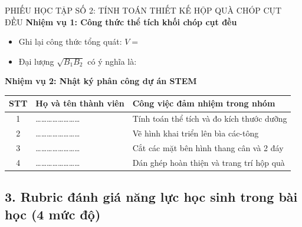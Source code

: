 \documentclass[12pt, a4paper]{article}
\begin{document}
\begin{itemize}[leftmargin=1.2cm]
\begin{pedabox}{PHIẾU HỌC TẬP SỐ 2: TÍNH TOÁN THIẾT KẾ HỘP QUÀ CHÓP CỤT ĐỀU}
    \textbf{Nhiệm vụ 1: Công thức thể tích khối chóp cụt đều}
    \begin{itemize}[leftmargin=0.6cm]
        \item Ghi lại công thức tổng quát: $V = $ \dotfill
        \item Đại lượng $\sqrt{B_1 B_2}$ có ý nghĩa là: \dotfill
    \end{itemize}

    \textbf{Nhiệm vụ 2: Nhật ký phân công dự án STEM}
    \begin{center}
    \begin{tabular}{|c|l|l|}
    \hline
    \textbf{STT} & \textbf{Họ và tên thành viên} & \textbf{Công việc đảm nhiệm trong nhóm} \\ \hline
    1 & \dots\dots\dots\dots\dots\dots\dots\dots & Tính toán thể tích và đo kích thước dưỡng \\ \hline
    2 & \dots\dots\dots\dots\dots\dots\dots\dots & Vẽ hình khai triển lên bìa các-tông \\ \hline
    3 & \dots\dots\dots\dots\dots\dots\dots\dots & Cắt các mặt bên hình thang cân và 2 đáy \\ \hline
    4 & \dots\dots\dots\dots\dots\dots\dots\dots & Dán ghép hoàn thiện và trang trí hộp quà \\ \hline
    \end{tabular}
    \end{center}
\end{pedabox}

\subsection*{3. Rubric đánh giá năng lực học sinh trong bài học (4 mức độ)}


\end{itemize}
\end{document}

